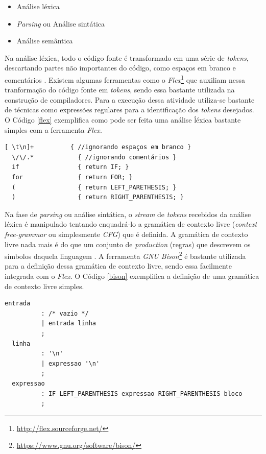 \begin{itemize}
\item Análise léxica
\item \textit{Parsing} ou Análise sintática
\item Análise semântica
\end{itemize}

Na análise léxica, todo o código fonte é transformado em uma série de
\textit{tokens}, descartando partes não importantes do código, como espaços em
branco e comentários \cite{chess&west2007}. Existem algumas ferramentas como o
\textit{Flex}\footnote{\url{http://flex.sourceforge.net/}} que auxiliam nessa
tranformação do código fonte em \textit{tokens}, sendo essa bastante utilizada
na construção de compiladores. Para a execução dessa atividade utiliza-se
bastante de técnicas como expressões regulares para a identificação dos
\textit{tokens} desejados. O Código \ref{flex} exemplifica como pode ser feita uma
análise ĺéxica bastante simples com a ferramenta \textit{Flex}.

\begin{lstlisting}[caption={Análise léxica simples com a ferramenta \textit{Flex}}, label=flex]
  [ \t\n]+          { //ignorando espaços em branco }
  \/\/.*            { //ignorando comentários }
  if                { return IF; }
  for               { return FOR; }
  (                 { return LEFT_PARETHESIS; }
  )                 { return RIGHT_PARENTHESIS; }
\end{lstlisting}

Na fase de \textit{parsing} ou análise sintática, o \textit{stream} de
\textit{tokens} recebidos da análise léxica é manipulado tentando enquadrá-lo a
gramática de contexto livre (\textit{context free-grammar} ou simplesmente
\textit{CFG}) que é definida. A gramática de contexto livre nada mais é do que
um conjunto de \textit{production} (regras) que descrevem os símbolos daquela
linguagem \cite{chess&west2007}. A ferramenta
\textit{GNU Bison}\footnote{\url{https://www.gnu.org/software/bison/}} é
bastante utilizada para a definição dessa gramática de contexto livre, sendo
essa facilmente integrada com o \textit{Flex}. O Código \ref{bison} exemplifica
a definição de uma gramática de contexto livre simples.

\begin{lstlisting}[caption={Definição de uma \textit{CFG} simples com a ferramenta
\textit{GNU Bison}}, label=bison]
  entrada    
          : /* vazio */
          | entrada linha
          ;
  linha     
          : '\n'
          | expressao '\n'
          ;
  expressao
          : IF LEFT_PARENTHESIS expressao RIGHT_PARENTHESIS bloco
          ;
\end{lstlisting}

